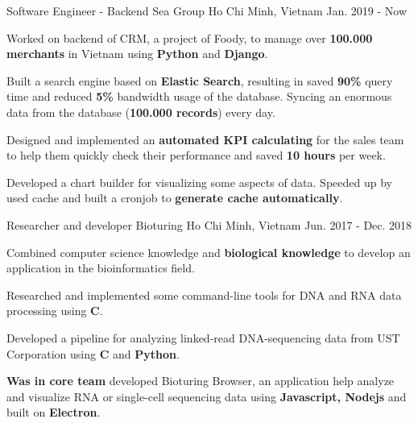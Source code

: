 

\begin{cventries}

  \cventry
    {Software Engineer - Backend} %
    {Sea Group} %
    {Ho Chi Minh, Vietnam} %
    {Jan. 2019 - Now} %
    {
      \begin{cvitems} %
        \item {Worked on backend of CRM, a project of Foody, to manage over \textbf{100.000 merchants} in Vietnam using \textbf{Python} and \textbf{Django}.}
        \item {Built a search engine based on \textbf{Elastic Search}, resulting in saved \textbf{90\%} query time and reduced \textbf{5\%} bandwidth usage of the database. Syncing an enormous data from the database (\textbf{100.000 records}) every day.}
        \item {Designed and implemented an \textbf{automated KPI calculating} for the sales team to help them quickly check their performance and saved \textbf{10 hours} per week.}
        \item {Developed a chart builder for visualizing some aspects of data. Speeded up by used cache and built a cronjob to \textbf{generate cache automatically}.}
      \end{cvitems}
    }

  \cventry
    {Researcher and developer} %
    {Bioturing} %
    {Ho Chi Minh, Vietnam} %
    {Jun. 2017 - Dec. 2018} %
    {
      \begin{cvitems} %
        \item {Combined computer science knowledge and \textbf{biological knowledge} to develop an application in the bioinformatics field.}
        \item {Researched and implemented some command-line tools for DNA and RNA data processing using \textbf{C}.}
        \item {Developed a pipeline for analyzing linked-read DNA-sequencing data from UST Corporation using \textbf{C} and \textbf{Python}.}
        \item {\textbf{Was in core team} developed Bioturing Browser, an application help analyze and visualize RNA or single-cell sequencing data using \textbf{Javascript, Nodejs} and built on \textbf{Electron}.}
      \end{cvitems}
    }


\end{cventries}
